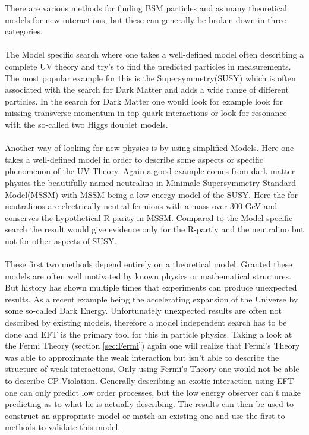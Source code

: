 \documentclass[../Bachelorarbeit.tex]{subfiles}
\begin{document}
There are various methods for finding BSM particles and as many theoretical models for new interactions, but these can generally be broken down in three categories.
\\\\
The Model specific search where one takes a well-defined model often describing a complete UV theory and try's to find the predicted particles in measurements.
The most popular example for this is the Supersymmetry(SUSY) which is often associated with the search for Dark Matter and adds a wide range of different particles.
In the search for Dark Matter one would look for example look for missing transverse momentum in top quark interactions or look for resonance with the so-called
two Higgs doublet models.
\\\\
Another way of looking for new physics is by using simplified Models. Here one takes a well-defined model in order to describe some aspects or specific phenomenon of the UV Theory.
Again a good example comes from dark matter physics the beautifully named neutralino in Minimale Supersymmetry Standard Model(MSSM) with MSSM being a low energy model of the SUSY.
Here the for neutralinos are electrically neutral fermions with a mass over 300 GeV and conserves the hypothetical R-parity in MSSM. Compared to the Model specific search the result
would give evidence only for the R-partiy and the neutralino but not for other aspects of SUSY.
\\\\
These first two methods depend entirely on a theoretical model. Granted these models are often well motivated by known physics or mathematical structures.
But history has shown multiple times that experiments can produce unexpected results. As a recent example being the accelerating expansion of the Universe by some so-called Dark Energy.
Unfortunately unexpected results are often not described by existing models, therefore a model independent search has to be done and EFT is the primary tool for this in particle physics.
Taking a look at the Fermi Theory (section \ref{sec:Fermi}) again one will realize that Fermi's Theory was able to approximate the weak interaction but isn't able to describe the
structure of weak interactions. Only using Fermi's Theory one would not be able to describe CP-Violation. Generally describing an exotic interaction using EFT one can only predict low order
processes, but the low energy observer can't make predicting as to what he is actually describing. The results can then be used to construct an appropriate model or match an existing one and
use the first to methods to validate this model.
\end{document}
